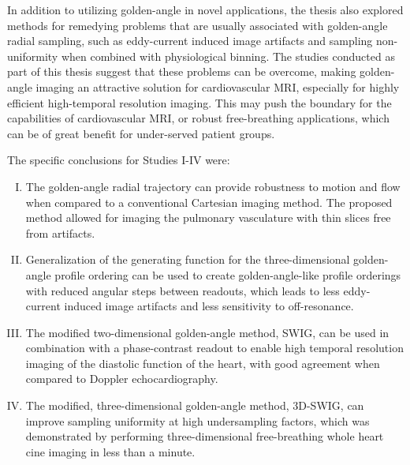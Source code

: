 In addition to utilizing golden-angle in novel applications, the thesis also explored methods for remedying problems that are usually associated with golden-angle radial sampling, such as eddy-current induced image artifacts and sampling non-uniformity when combined with physiological binning. The studies conducted as part of this thesis suggest that these problems can be overcome, making golden-angle imaging an attractive solution for cardiovascular MRI, especially for highly efficient high-temporal resolution imaging. This may push the boundary for the capabilities of cardiovascular MRI, or robust free-breathing applications, which can be of great benefit for under-served patient groups.

The specific conclusions for Studies I-IV were:
\begin{enumerate}[I.]
    \item The golden-angle radial trajectory can provide robustness to motion and flow when compared to a conventional Cartesian imaging method. The proposed method allowed for imaging the pulmonary vasculature with thin slices free from artifacts.
    \item Generalization of the generating function for the three-dimensional golden-angle profile ordering can be used to create golden-angle-like profile orderings with reduced angular steps between readouts, which leads to less eddy-current induced image artifacts and less sensitivity to off-resonance.
    \item The modified two-dimensional golden-angle method, SWIG, can be used in combination with a phase-contrast readout to enable high temporal resolution imaging of the diastolic function of the heart, with good agreement when compared to Doppler echocardiography.
    \item The modified, three-dimensional golden-angle method, 3D-SWIG, can improve sampling uniformity at high undersampling factors, which was demonstrated by performing three-dimensional free-breathing whole heart cine imaging in less than a minute.
\end{enumerate}


